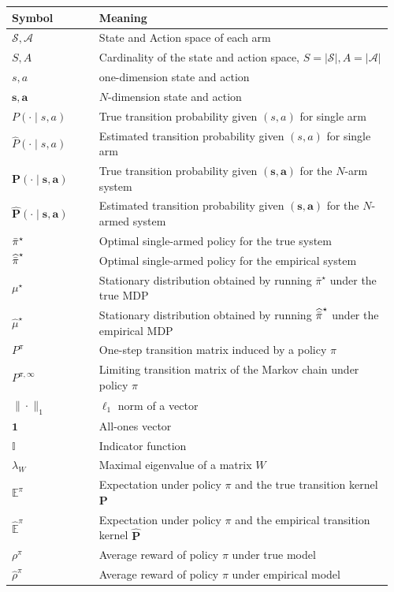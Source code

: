 \documentclass[mnsc,nonblindrev]{informs3}
\newcommand{\bp}{\bm{P}}
\newcommand{\bphat}{\widehat{\bm{P}}}
\newcommand{\one}{\mathbf{1}}
\newcommand{\pibst}{\Bar{\pi}^\star}
\newcommand{\pihbst}{\widehat{\Bar{\pi}}^\star}
\newcommand{\bms}{\bm{s}}
\newcommand{\bma}{\bm{a}}
\newcommand{\Actions}{\mathcal{A}}
\begin{document}
\begin{APPENDICES}
\begin{longtable}{p{0.22\linewidth}p{0.74\linewidth}}
\textbf{Symbol} & \textbf{Meaning} \\
\hline
$\mathcal{S}, \Actions$ & State and Action space of each arm \\
$S,A$ & Cardinality of the state and action space, $S = |\mathcal{S}|, A=|\Actions|$ \\
$s,a$ & one-dimension state and action \\
$\bms,\bma$ & $N$-dimension state and action  \\
$P(\cdot \mid s,a)$ & True transition probability given $(s,a)$ for single arm \\
$\widehat{P}(\cdot \mid s,a)$ & Estimated transition probability given $(s,a)$ for single arm  \\
$\bp(\cdot \mid \bms,\bma)$ & True transition probability given $(\bms,\bma)$ for the $N$-arm system \\
$\widehat{\bp}(\cdot \mid \bms,\bma)$ & Estimated transition probability given $(\bms,\bma)$ for the $N$-armed system  \\
$\pibst$ & Optimal single-armed policy for the true system\\
$\pihbst$ & Optimal single-armed policy for the empirical system\\
$\mu^{\star}$ & Stationary distribution obtained by running $\bar{\pi}^{\star}$ under the true MDP \\
$\widehat{\mu}^{\star}$ & Stationary distribution obtained by running $\pihbst$ under the empirical MDP \\
$P^{\pi}$ & One-step transition matrix induced by a policy $\pi$ \\
$P^{\pi,\infty}$ & Limiting transition matrix of the Markov chain under policy $\pi$\\
$\|\cdot\|_{1}$ & $\ell_{1}$ norm of a vector \\
$\one$ & All-ones vector \\
$\mathbb{I}$ & Indicator function \\
$\lambda_{W}$ & Maximal eigenvalue of a matrix $W$ \\
$\mathbb{E}^\pi$ & Expectation under policy $\pi$ and the true transition kernel $\bp$ \\
$\widehat{\mathbb{E}}^\pi$ & Expectation under policy $\pi$ and the empirical transition kernel $\bphat$ \\
$\rho^\pi$ & Average reward of policy $\pi$ under true model \\
$\widehat{\rho}^\pi$ & Average reward of policy $\pi$ under empirical model \\
\hline
\end{longtable}


\end{APPENDICES}
\end{document}
